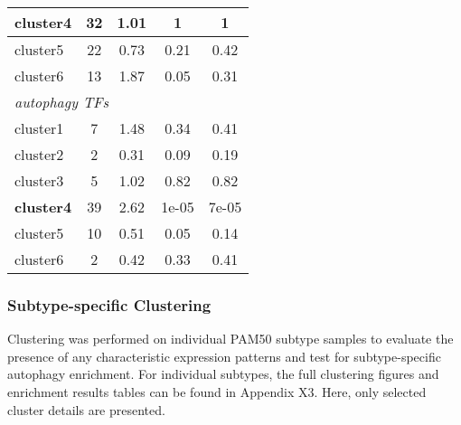 \begin{table}[!h]
\begin{tabular}{lcccc}
            \multicolumn{1}{l|}{cluster4} & \multicolumn{1}{c|}{32} & \multicolumn{1}{c|}{1.01} & \multicolumn{1}{c|}{1} & 1 \\ \hline
            \multicolumn{1}{l|}{cluster5} & \multicolumn{1}{c|}{22} & \multicolumn{1}{c|}{0.73} & \multicolumn{1}{c|}{0.21} & 0.42 \\ \hline
            \multicolumn{1}{l|}{cluster6} & \multicolumn{1}{c|}{13} & \multicolumn{1}{c|}{1.87} & \multicolumn{1}{c|}{0.05} & 0.31 \\ \hline
            \multicolumn{5}{l}{\textit{autophagy TFs}} \\ \hline
            \multicolumn{1}{l|}{cluster1} & \multicolumn{1}{c|}{7} & \multicolumn{1}{c|}{1.48} & \multicolumn{1}{c|}{0.34} & 0.41 \\ \hline
            \multicolumn{1}{l|}{cluster2} & \multicolumn{1}{c|}{2} & \multicolumn{1}{c|}{0.31} & \multicolumn{1}{c|}{0.09} & 0.19 \\ \hline
            \multicolumn{1}{l|}{cluster3} & \multicolumn{1}{c|}{5} & \multicolumn{1}{c|}{1.02} & \multicolumn{1}{c|}{0.82} & 0.82 \\ \hline
            \multicolumn{1}{l|}{\textbf{cluster4}} & \multicolumn{1}{c|}{39} & \multicolumn{1}{c|}{2.62} & \multicolumn{1}{c|}{1e-05} & 7e-05 \\ \hline
            \multicolumn{1}{l|}{cluster5} & \multicolumn{1}{c|}{10} & \multicolumn{1}{c|}{0.51} & \multicolumn{1}{c|}{0.05} & 0.14 \\ \hline
            \multicolumn{1}{l|}{cluster6} & \multicolumn{1}{c|}{2} & \multicolumn{1}{c|}{0.42} & \multicolumn{1}{c|}{0.33} & 0.41 \\ \hline
            \end{tabular}
            \end{table}
        
     
        \newpage
        \subsubsection{Subtype-specific Clustering}
        
        Clustering was performed on individual PAM50 subtype samples to evaluate the presence of any characteristic expression patterns and test for subtype-specific autophagy enrichment. 
        For individual subtypes, the full clustering figures and enrichment results tables can be found in Appendix X3. Here, only selected cluster details are presented. 
        
